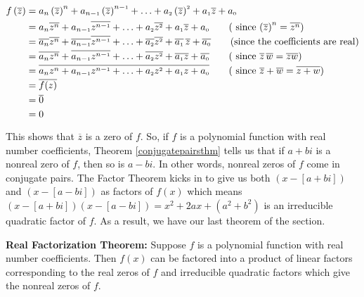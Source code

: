 \begin{align*}
 f\left(\overline{z}\right) & = a_{n} \left(\overline{z}\right)^{n} + a_{n-\mbox{\tiny$1$}} \left(\overline{z}\right)^{n-\mbox{\tiny$1$}} + \ldots + a_{\mbox{\tiny $2$}}\left( \overline{z}\right)^{\mbox{\tiny $2$}} + a_{\mbox{\tiny $1$}} \overline{z} + a_{\mbox{\tiny $0$}} \\
 &  = a_{n}\overline{z^{n}} + a_{n-\mbox{\tiny$1$}}\overline{z^{n-\mbox{\tiny$1$}}} + \ldots + a_{\mbox{\tiny $2$}}\overline{z^{\mbox{\tiny $2$}}} + a_{\mbox{\tiny $1$}} \overline{z} + a_{\mbox{\tiny $0$}} \tag{ since $\left(\overline{z}\right)^n = \overline{z^{n}}$}\\
 & = \overline{a_{n}}\overline{z^{n}} + \overline{a_{n-\mbox{\tiny$1$}}}\overline{z^{n-\mbox{\tiny$1$}}} + \ldots +  \overline{a_{\mbox{\tiny $2$}}}\overline{z^{\mbox{\tiny $2$}}} + \overline{a_{\mbox{\tiny $1$}}}\, \overline{z} + \overline{a_{\mbox{\tiny $0$}}} \tag{since the coefficients are real} \\
 & = \overline{a_{n} z^{n}} + \overline{a_{n-\mbox{\tiny$1$}} z^{n-\mbox{\tiny$1$}}} + \ldots +  \overline{a_{\mbox{\tiny $2$}} z^{\mbox{\tiny $2$}}} + \overline{a_{\mbox{\tiny $1$}} z} + \overline{a_{\mbox{\tiny $0$}}} \tag{ since $\overline{z} \, \overline{w}=\overline{zw} $}\\
 & = \overline{a_{n} z^{n} + a_{n-\mbox{\tiny$1$}} z^{n-\mbox{\tiny$1$}} + \ldots + a_{\mbox{\tiny $2$}} z^{\mbox{\tiny $2$}} + a_{\mbox{\tiny $1$}} z + a_{\mbox{\tiny $0$}}} \tag{ since $ \overline{z} + \overline{w} = \overline{z+w} $}\\
 & = \overline{f(z)} \\
 & = \overline{0} \\
 & = 0 \\
\end{align*}

This shows that $\overline{z}$ is a zero of $f$.  So, if $f$ is a polynomial function with real number coefficients, Theorem \ref{conjugatepairsthm} tells us that if $a+bi$ is a nonreal zero of $f$, then so is $a-bi$.  In other words, nonreal zeros of $f$ come in conjugate pairs.  The Factor Theorem kicks in to give us both $(x-[a+bi])$ and $(x-[a-bi])$ as factors of $f(x)$ which means $(x-[a+bi])(x-[a-bi]) = x^2 + 2a x + \left(a^2+b^2\right)$ is an irreducible quadratic factor of $f$.  As a result, we have our last theorem of the section.

\begin{tcolorbox}
\begin{thm}\label{realfactorization}\textbf{Real Factorization Theorem:} Suppose $f$ is a polynomial function with real number coefficients.  Then $f(x)$ can be factored into a product of linear factors corresponding to the real zeros of $f$ and irreducible quadratic factors which give the nonreal zeros of $f$. 
\end{thm}
\end{tcolorbox}

